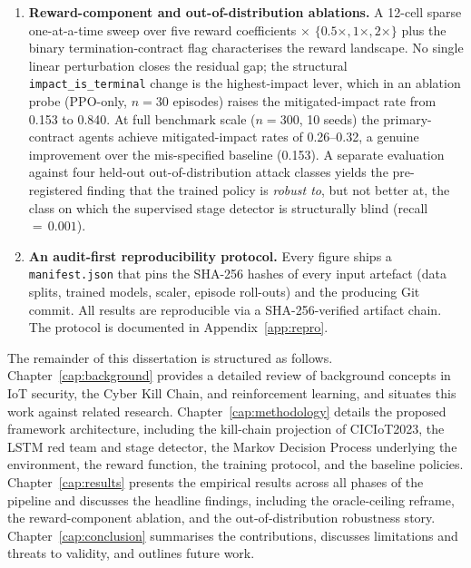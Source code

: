 \begin{enumerate}
    \item \textbf{Reward-component and out-of-distribution ablations.} A 12-cell sparse one-at-a-time sweep over five reward coefficients $\times$ $\{0.5\times, 1\times, 2\times\}$ plus the binary termination-contract flag characterises the reward landscape. No single linear perturbation closes the residual gap; the structural \texttt{impact\_is\_terminal} change is the highest-impact lever, which in an ablation probe (PPO-only, $n=30$ episodes) raises the mitigated-impact rate from 0.153 to 0.840. At full benchmark scale ($n=300$, 10 seeds) the primary-contract agents achieve mitigated-impact rates of 0.26--0.32, a genuine improvement over the mis-specified baseline (0.153). A separate evaluation against four held-out out-of-distribution attack classes yields the pre-registered finding that the trained policy is \emph{robust to}, but not better at, the class on which the supervised stage detector is structurally blind (recall\,$=\,0.001$).

    \item \textbf{An audit-first reproducibility protocol.} Every figure ships a \texttt{manifest.json} that pins the SHA-256 hashes of every input artefact (data splits, trained models, scaler, episode roll-outs) and the producing Git commit. All results are reproducible via a SHA-256-verified artifact chain. The protocol is documented in Appendix~\ref{app:repro}.
\end{enumerate}

The remainder of this dissertation is structured as follows. Chapter~\ref{cap:background} provides a detailed review of background concepts in IoT security, the Cyber Kill Chain, and reinforcement learning, and situates this work against related research. Chapter~\ref{cap:methodology} details the proposed framework architecture, including the kill-chain projection of CICIoT2023, the LSTM red team and stage detector, the Markov Decision Process underlying the environment, the reward function, the training protocol, and the baseline policies. Chapter~\ref{cap:results} presents the empirical results across all phases of the pipeline and discusses the headline findings, including the oracle-ceiling reframe, the reward-component ablation, and the out-of-distribution robustness story. Chapter~\ref{cap:conclusion} summarises the contributions, discusses limitations and threats to validity, and outlines future work.
